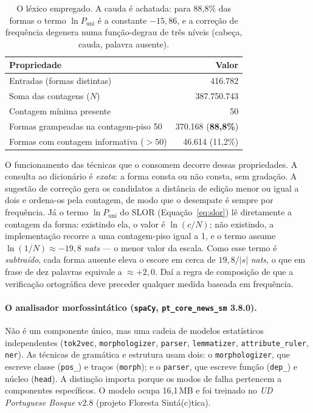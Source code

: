 \documentclass[11pt,a4paper]{article}
\newcommand{\dimtable}[1]{\small #1}
\begin{document}
\begin{table}[H]
\centering
\dimtable{
\begin{tabular}{@{}lr@{}}
\toprule
\textbf{Propriedade} & \textbf{Valor} \\
\midrule
Entradas (formas distintas)                       & 416.782 \\
Soma das contagens ($N$)                          & 387.750.743 \\
Contagem mínima presente                          & 50 \\
Formas grampeadas na contagem-piso 50             & 370.168 \; (\textbf{88,8\%}) \\
Formas com contagem informativa ($>50$)           & 46.614 \; (11,2\%) \\
\bottomrule
\end{tabular}}
\caption{O léxico empregado. A cauda é achatada: para 88,8\% das formas o termo
$\ln P_{\mathrm{uni}}$ é a constante $-15{,}86$, e a correção de frequência degenera numa
função-degrau de três níveis (cabeça, cauda, palavra ausente).}
\label{tab:lexico}
\end{table}

\noindent O funcionamento das técnicas que o consomem decorre dessas propriedades. A consulta ao
dicionário é \emph{exata}: a forma consta ou não consta, sem gradação. A sugestão de correção gera
os candidatos a distância de edição menor ou igual a dois e ordena-os pela contagem, de modo que o
desempate é sempre por frequência. Já o termo $\ln P_{\mathrm{uni}}$ do SLOR
(Equação~\ref{eq:slor}) lê diretamente a contagem da forma: existindo ela, o valor é $\ln(c/N)$;
não existindo, a implementação recorre a uma contagem-piso igual a 1, e o termo assume
$\ln(1/N) \approx -19{,}8$ \textit{nats} --- o menor valor da escala. Como esse termo é
\emph{subtraído}, cada forma ausente eleva o escore em cerca de $19{,}8/|s|$ \textit{nats}, o que em
frase de dez palavras equivale a $\approx +2{,}0$. Daí a regra de composição de que a verificação
ortográfica deve preceder qualquer medida baseada em frequência.

\paragraph{O analisador morfossintático (\texttt{spaCy}, \texttt{pt\_core\_news\_sm} 3.8.0).} Não é
um componente único, mas uma cadeia de modelos estatísticos independentes
(\texttt{tok2vec}, \texttt{morphologizer}, \texttt{parser}, \texttt{lemmatizer},
\texttt{attribute\_ruler}, \texttt{ner}). As técnicas de gramática e estrutura usam dois: o
\texttt{morphologizer}, que escreve classe (\texttt{pos\_}) e traços (\texttt{morph}); e o
\texttt{parser}, que escreve função (\texttt{dep\_}) e núcleo (\texttt{head}). A distinção importa
porque os modos de falha pertencem a componentes específicos. O modelo ocupa 16,1\,MB e foi treinado
no \textit{UD Portuguese Bosque} v2.8 (projeto Floresta Sintá(c)tica).
\end{document}
